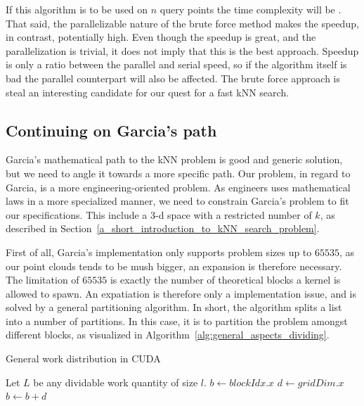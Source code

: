 If this algorithm is to be used on $n$ query points the time complexity will be . That said, the parallelizable nature of the brute force method makes the speedup, in contrast, potentially high. Even though the speedup is great, and the parallelization is trivial, it does not imply that this is the best approach. Speedup is only a ratio between the parallel and serial speed, so if the algorithm itself is bad the parallel counterpart will also be affected. The brute force approach is steal an interesting candidate for our quest for a fast kNN search.

\subsection{Continuing on Garcia's path} %
\label{sub:continuing_on_garcia_s_path} 

Garcia's mathematical path to the kNN problem is good and generic solution, but we need to angle it towards a more specific path. Our problem, in regard to Garcia, is a more engineering-oriented problem. As engineers uses mathematical laws in a more specialized manner, we need to constrain Garcia's problem to fit our specifications. This include a 3-d space with a restricted number of $k$, as described in Section~\ref{a_short_introduction_to_kNN_search_problem}.

First of all, Garcia's implementation only supports problem sizes up to $65535$, as our point clouds tends to be mush bigger, an expansion is therefore necessary. The limitation of $65535$ is exactly the number of theoretical blocks a kernel is allowed to spawn. An expatiation is therefore only a implementation issue, and is solved by a general partitioning algorithm. In short, the algorithm splits a list into a number of partitions. In this case, it is to partition the problem amongst different blocks, as visualized in Algorithm~\ref{alg:general_aspects_dividing}. 

\begin{algorithm}[ht]
\caption{General work distribution in CUDA}
\label{alg:general_aspects_dividing}
\begin{algorithmic}
\State Let $L$ be any dividable work quantity of size $l$.
    \State $b \gets blockIdx.x$ 
    \State $d \gets gridDim.x$ 
    \State {}
    \State $b \gets b + d$
    \EndWhile
    \EndFunction
\end{algorithmic}
\end{algorithm}

